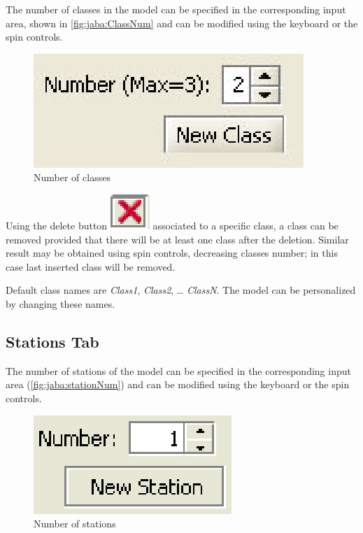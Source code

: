 The number of classes in the model can be specified in the
corresponding input area, shown in \autoref{fig:jaba:ClassNum} and
can be modified using the keyboard or the spin controls.
\begin{figure}[htbp]
    \begin{center}
        \includegraphics[scale=.5]{img/jaba/classNum}
    \end{center}
    \caption{Number of classes}
    \label{fig:jaba:ClassNum}
\end{figure}

Using the delete button
\includegraphics[scale=.6]{img/jaba/x} associated to a specific
class, a class can be removed provided that there will be at least
one class after the deletion. Similar result may be obtained using
spin controls, decreasing classes number; in this case last inserted
class will be removed.

Default class names are \emph{Class1}, \emph{Class2}, \dots
\emph{ClassN}. The model can be personalized by changing these names.

\subsection{Stations Tab}
The number of stations of the model can be specified in the
corresponding input area (\autoref{fig:jaba:stationNum}) and can be
modified using the keyboard or the spin controls.

\begin{figure}[htbp]
    \begin{center}
        \includegraphics[scale=.5]{img/jaba/stationNum}
    \end{center}
    \caption{Number of stations}
    \label{fig:jaba:stationNum}
\end{figure}

